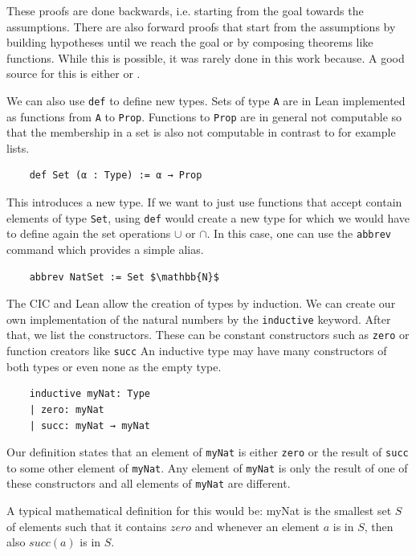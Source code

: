 These proofs are done backwards, i.e. starting from the goal towards the assumptions. There are also forward proofs that start from the assumptions by building hypotheses until we reach the goal or by composing theorems like functions. While this is possible, it was rarely done in this work because. A good source for this is either \cite{theoremProvingLean} or \cite{HitchhikerLogicVer}.


We can also use \lstinline|def| to define new types. Sets of type \lstinline|A| are in Lean implemented as functions from \lstinline|A| to \lstinline|Prop|. Functions to \lstinline|Prop| are in general not computable so that the membership in a set is also not computable in contrast to for example lists.

\begin{lstlisting}
    def Set (α : Type) := α → Prop
\end{lstlisting}

This introduces a new type. If we want to just use functions that accept contain elements of type \lstinline|Set|, using \lstinline|def| would create a new type for which we would have to define again the set operations $\cup$ or $\cap$. In this case, one can use the \lstinline|abbrev| command which provides a simple alias.

\begin{lstlisting}
    abbrev NatSet := Set $\mathbb{N}$
\end{lstlisting}

The CIC and Lean allow the creation of types by induction. We can create our own implementation of the natural numbers by the \lstinline|inductive| keyword. After that, we list the constructors. These can be constant constructors such as \lstinline|zero| or function creators like \lstinline|succ|
An inductive type may have many constructors of both types or even none as the empty type.

\begin{lstlisting}
    inductive myNat: Type
    | zero: myNat
    | succ: myNat → myNat
\end{lstlisting}

Our definition states that an element of \lstinline|myNat| is either \lstinline|zero| or the result of \lstinline|succ| to some other element of \lstinline|myNat|. Any element of \lstinline|myNat| is only the result of one of these constructors and all elements of \lstinline|myNat| are different.

A typical mathematical definition for this would be: myNat is the smallest set $S$ of elements such that it contains $zero$ and whenever an element $a$ is in $S$, then also $succ(a)$ is in $S$.

